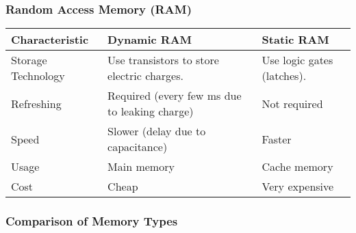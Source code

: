 \subsubsection{Random Access Memory (RAM)}

\begin{table}[H]
    \centering
    \begin{tabular}{|l|l|l|}
    \hline
    \textbf{Characteristic} & \textbf{Dynamic RAM}                          & \textbf{Static RAM}        \\ \hline
    Storage Technology      & Use transistors to store electric charges.    & Use logic gates (latches). \\ \hline
    Refreshing              & Required (every few ms due to leaking charge) & Not required               \\ \hline
    Speed                   & Slower (delay due to capacitance)             & Faster                     \\ \hline
    Usage                   & Main memory                                   & Cache memory               \\ \hline
    Cost                    & Cheap                                         & Very expensive             \\ \hline
    \end{tabular}
\end{table}

\subsubsection{Comparison of Memory Types}

